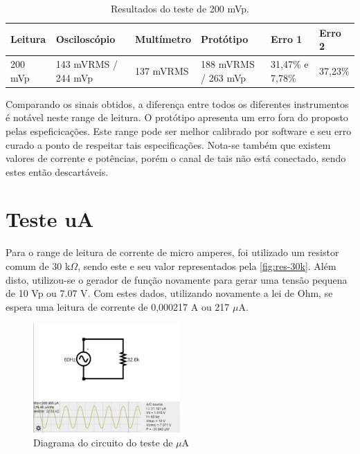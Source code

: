 \begin{table}[!ht]
    \centering
    \caption{Resultados do teste de 200 mVp.}
    \label{tab:resultadoss-200}
    \begin{tabular}{|p{2cm}|p{3cm}|p{2cm}|p{2cm}|p{2cm}|p{2cm}|}
        \hline
        \textbf{Leitura} & \textbf{Osciloscópio} & \textbf{Multímetro} & \textbf{Protótipo}    & \textbf{Erro 1}  & \textbf{Erro 2}   \\ \hline
        200 mVp          & 143 mVRMS / 244 mVp   & 137 mVRMS           & 188 mVRMS / 263 mVp   & 31,47\% e 7,78\% & 37,23\%           \\ \hline
    \end{tabular}
    \fonte{}
\end{table}

Comparando os sinais obtidos, a diferença entre todos os diferentes instrumentos é notável neste range de leitura. O protótipo apresenta um erro fora do proposto pelas espeficicações. Este range pode ser melhor calibrado por software e seu erro curado a ponto de respeitar tais especificações. Nota-se também que existem valores de corrente e potências, porém o canal de tais não está conectado, sendo estes então descartáveis.

\section{Teste uA}\label{teste-ua}

Para o range de leitura de corrente de micro amperes, foi utilizado um resistor comum de 30 k$\Omega$, sendo este e seu valor representados pela \autoref{fig:res-30k}. Além disto, utilizou-se o gerador de função novamente para gerar uma tensão pequena de 10 Vp ou 7.07 V. Com estes dados, utilizando novamente a lei de Ohm, se espera uma leitura de corrente de 0,000217 A ou 217 $\mu$A.

\begin{figure}[htb!]
    \caption{Diagrama do circuito do teste de $\mu$A}
    \label{fig:circ-ua}
    \includegraphics[width=0.5\textwidth]{figuras/circ-ua-falstad.png}
    \fonte{}
\end{figure}

